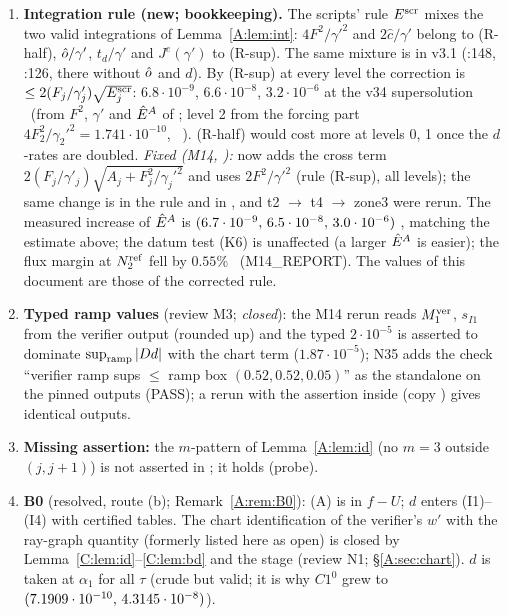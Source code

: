 \documentclass[11pt]{article}
\begin{document}
\begin{enumerate}[label=(G-A\arabic*),leftmargin=3.4em]
\item \textbf{Integration rule (new; bookkeeping).} The scripts' rule $E^{\rm scr}$ mixes the two valid integrations of Lemma~\ref{A:lem:int}: $4F^2/\gamma'^2$ and $2\hat c/\gamma'$ belong to (R-half), $\hat o/\gamma'$, $t_d/\gamma'$ and $J^e(\gamma')$ to (R-sup). The same mixture is in v3.1 (:148, :126, there without $\hat o$ and $d$). By (R-sup) at every level the correction is $\le2(F_j/\gamma'_j)\sqrt{E^{\rm scr}_j}$: $6.8\cdot10^{-9}$, $6.6\cdot10^{-8}$, $3.2\cdot10^{-6}$ at the v34 supersolution \tE\ (from $F^2$, $\gamma'$ and $\hat E^A$ of ; level 2 from the forcing part $4F_2^2/\gamma_2'^2=1.741\cdot10^{-10}$, \SA\ ). (R-half) would cost more at levels 0, 1 once the $d$-rates are doubled. \emph{Fixed (M14, ):}  now adds the cross term $2(F_j/\gamma'_j)\sqrt{A_j+F_j^2/\gamma_j'^2}$ and uses $2F^2/\gamma'^2$ (rule (R-sup), all levels); the same change is in the rule  and in , and t2 $\to$ t4 $\to$ zone3 were rerun. The measured increase of $\hat E^A$ is $(6.7\cdot10^{-9},\,6.5\cdot10^{-8},\,3.0\cdot10^{-6})$ \tE, matching the estimate above; the datum test (K6) is unaffected (a larger $\hat E^A$ is easier); the flux margin at $N_2^{\rm ref}$ fell by $0.55\%$ \tE\ (M14\_REPORT). The values of this document are those of the corrected rule.
\item \textbf{Typed ramp values} (review M3; \emph{closed}): the M14 rerun reads $M_1^{\rm ver}$, $s_{I1}$ from the verifier output (rounded up) and the typed $2\cdot10^{-5}$ is asserted to dominate $\sup_{\rm ramp}|Dd|$ with the chart term ($1.87\cdot10^{-5}$); N35 adds the check ``verifier ramp sups $\le$ ramp box $(0.52,0.52,0.05)$'' as the standalone  on the pinned outputs (PASS); a rerun with the assertion inside  (copy ) gives identical outputs.
\item \textbf{Missing assertion:} the $m$-pattern of Lemma~\ref{A:lem:id} (no $m=3$ outside $(j,j+1)$) is not asserted in ; it holds (probe).
\item \textbf{B0} (resolved, route (b); Remark~\ref{A:rem:B0}): (A) is in $f-U$; $d$ enters (I1)--(I4) with certified tables. The chart identification of the verifier's $w'$ with the ray-graph quantity (formerly listed here as open) is closed by Lemma~\ref{C:lem:id}--\ref{C:lem:bd} and the stage  (review N1; \S\ref{A:sec:chart}). $d$ is taken at $\alpha_1$ for all $\tau$ (crude but valid; it is why $C1^0$ grew to $(7.1909\cdot10^{-10},\,4.3145\cdot10^{-8})$).

\end{enumerate}
\end{document}
